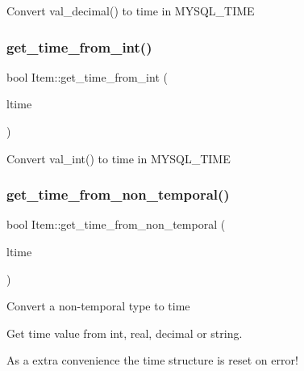 Convert val\+\_\+decimal() to time in M\+Y\+S\+Q\+L\+\_\+\+T\+I\+ME \mbox{\label{classItem_afc9b0e1c1a122f5394f6ab80135cfd24}} 
\subsubsection{\texorpdfstring{get\+\_\+time\+\_\+from\+\_\+int()}{get\_time\_from\_int()}}
{\footnotesize\ttfamily bool Item\+::get\+\_\+time\+\_\+from\+\_\+int (\begin{DoxyParamCaption}\item[{M\+Y\+S\+Q\+L\+\_\+\+T\+I\+ME $\ast$}]{ltime }\end{DoxyParamCaption})\hspace{0.3cm}{\ttfamily [protected]}}

Convert val\+\_\+int() to time in M\+Y\+S\+Q\+L\+\_\+\+T\+I\+ME \mbox{\label{classItem_a7af21871229b24c64767bb189a8fa42f}} 
\subsubsection{\texorpdfstring{get\+\_\+time\+\_\+from\+\_\+non\+\_\+temporal()}{get\_time\_from\_non\_temporal()}}
{\footnotesize\ttfamily bool Item\+::get\+\_\+time\+\_\+from\+\_\+non\+\_\+temporal (\begin{DoxyParamCaption}\item[{M\+Y\+S\+Q\+L\+\_\+\+T\+I\+ME $\ast$}]{ltime }\end{DoxyParamCaption})\hspace{0.3cm}{\ttfamily [protected]}}

Convert a non-\/temporal type to time

Get time value from int, real, decimal or string.

As a extra convenience the time structure is reset on error! \mbox{\label{classItem_aba77318c46ff171c2a388ec16625afc2}} 
